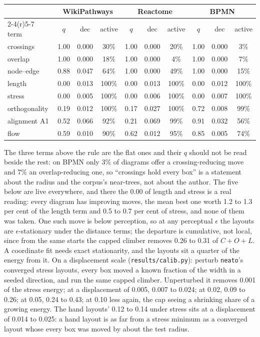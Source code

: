 \documentclass[11pt]{article}
\begin{document}
\begin{center}\small
\begin{tabular}{@{}lccc@{\hspace{14pt}}ccc@{\hspace{14pt}}ccc@{}}
\toprule
& \multicolumn{3}{c}{WikiPathways} & \multicolumn{3}{c}{Reactome} & \multicolumn{3}{c}{BPMN} \\
\cmidrule(r){2-4}\cmidrule(r){5-7}\cmidrule{8-10}
term & $q$ & dec & active & $q$ & dec & active & $q$ & dec & active \\
\midrule
crossings      & 1.00 & 0.000 & 30\% & 1.00 & 0.000 & 20\% & 1.00 & 0.000 & 3\% \\
overlap        & 1.00 & 0.000 & 18\% & 1.00 & 0.000 & 4\%  & 1.00 & 0.000 & 7\% \\
node--edge     & 0.88 & 0.047 & 64\% & 1.00 & 0.000 & 49\% & 1.00 & 0.000 & 15\% \\
\midrule
length         & 0.00 & 0.013 & 100\% & 0.00 & 0.013 & 100\% & 0.00 & 0.012 & 100\% \\
stress         & 0.00 & 0.005 & 100\% & 0.00 & 0.006 & 100\% & 0.00 & 0.007 & 100\% \\
orthogonality  & 0.19 & 0.012 & 100\% & 0.17 & 0.027 & 100\% & 0.72 & 0.008 & 99\% \\
alignment A1   & 0.52 & 0.066 & 92\%  & 0.21 & 0.069 & 99\%  & 0.91 & 0.032 & 56\% \\
flow           & 0.59 & 0.010 & 90\%  & 0.62 & 0.012 & 95\%  & 0.85 & 0.005 & 74\% \\
\bottomrule
\end{tabular}
\end{center}

The three terms above the rule are the flat ones and their $q$ should not be read beside
the rest: on BPMN only 3\% of diagrams offer a crossing-reducing move and 7\% an
overlap-reducing one, so ``crossings hold every box'' is a statement about the radius and
the corpus's near-trees, not about the author. The five below are live everywhere, and
there the $0.00$ of length and stress is a real reading: every diagram has improving moves,
the mean best one worth 1.2 to 1.3 per cent of the length term and 0.5 to 0.7 per cent of
stress, and none of them was taken. One such move is below perception, so at any
perceptual $\epsilon$ the layouts are $\epsilon$-stationary under the distance terms; the
departure is cumulative, not local, since from the same starts the capped climber removes
0.26 to 0.31 of $C{+}O{+}L$. A coordinate fit needs exact stationarity, and the
layouts sit a quarter of the energy from it. On a displacement scale
(\texttt{results/calib.py}): perturb \texttt{neato}'s converged stress layouts, every
box moved a known fraction of the width in a seeded direction, and run the same capped
climber. Unperturbed it removes 0.001 of the stress energy; at a displacement of 0.005,
0.007 to 0.024; at 0.02, 0.09 to 0.26; at 0.05, 0.24 to 0.43; at 0.10 less again, the
cap seeing a shrinking share of a growing energy. The hand layouts' 0.12 to 0.14 under
stress sits at a displacement of 0.014 to 0.025: a hand layout is as far from a stress
minimum as a converged layout whose every box was moved by about the test radius.
\end{document}
